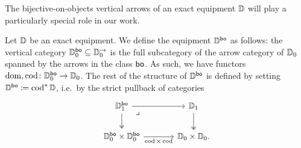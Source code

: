 \documentclass[11pt,oneside,article]{memoir}
\begin{document}
The bijective-on-objects vertical arrows of an exact equipment $\mathbb{D}$ will play a particularly special role in our work. 
\begin{definition}
   Let $\mathbb{D}$ be an exact equipment. We define the equipment $\mathbb{D}^{\mathsf{bo}}$ as follows: the
   vertical category $\mathbb{D}_0^{\mathsf{bo}}\subseteq\mathbb{D}_0^{\rightarrow}$ is the full subcategory of the arrow category of
   $\mathbb{D}_0$ spanned by the arrows in the class $\mathsf{bo}$. As such, we have functors $\operatorname{dom},\operatorname{cod}\colon\mathbb{D}_0^{\mathsf{bo}}\to\mathbb{D}_0$. The rest of the structure of $\mathbb{D}^{\mathsf{bo}}$ is defined by
   setting $\mathbb{D}^{\mathsf{bo}}\coloneqq\operatorname{cod}^*\mathbb{D}$, i.e.\ by the strict pullback of categories
   \[ \begin{tikzcd}[column sep=large]
      \dcat{D}_1^{\bo} \ar[r] \ar[d, two heads] \ar[dr,phantom,"\lrcorner" very near start]
         & \dcat{D}_1 \ar[d, two heads] \\
      \dcat{D}_0^{\bo}\times\dcat{D}_0^{\bo} \ar[r,"\cod\times\cod"']
         & \dcat{D}_0\times\dcat{D}_0.
   \end{tikzcd} \]
\end{definition}
\end{document}
